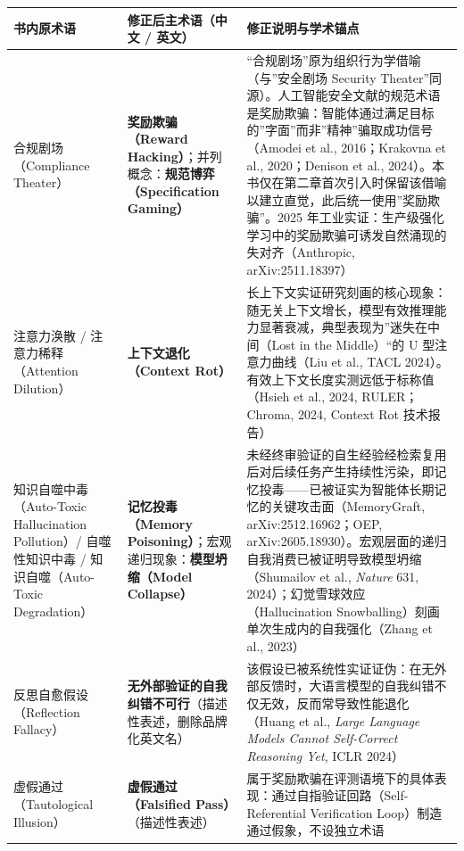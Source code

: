 {\def\LTcaptype{} %
\begin{longtable}[]{@{}
  >{\raggedright\arraybackslash}p{}
  >{\raggedright\arraybackslash}p{}
  >{\raggedright\arraybackslash}p{}@{}}
\toprule\noalign{}
\begin{minipage}[b]{\linewidth}\raggedright
书内原术语
\end{minipage} & \begin{minipage}[b]{\linewidth}\raggedright
修正后主术语（中文 / 英文）
\end{minipage} & \begin{minipage}[b]{\linewidth}\raggedright
修正说明与学术锚点
\end{minipage} \\
\midrule\noalign{}
\endhead
\bottomrule\noalign{}
\endlastfoot
合规剧场（Compliance Theater） & \textbf{奖励欺骗（Reward
Hacking）}；并列概念：\textbf{规范博弈（Specification Gaming）} &
``合规剧场''原为组织行为学借喻（与''安全剧场 Security
Theater''同源）。人工智能安全文献的规范术语是奖励欺骗：智能体通过满足目标的''字面''而非''精神''骗取成功信号（Amodei
et al., 2016；Krakovna et al., 2020；Denison et al.,
2024）。本书仅在第二章首次引入时保留该借喻以建立直觉，此后统一使用''奖励欺骗''。2025
年工业实证：生产级强化学习中的奖励欺骗可诱发自然涌现的失对齐（Anthropic,
arXiv:2511.18397） \\
注意力涣散 / 注意力稀释（Attention Dilution） &
\textbf{上下文退化（Context Rot）} &
长上下文实证研究刻画的核心现象：随无关上下文增长，模型有效推理能力显著衰减，典型表现为''迷失在中间（Lost
in the Middle）``的 U 型注意力曲线（Liu et al., TACL
2024）。有效上下文长度实测远低于标称值（Hsieh et al., 2024,
RULER；Chroma, 2024, Context Rot 技术报告） \\
知识自噬中毒（Auto-Toxic Hallucination Pollution）/ 自噬性知识中毒 /
知识自噬（Auto-Toxic Degradation） & \textbf{记忆投毒（Memory
Poisoning）}；宏观递归现象：\textbf{模型坍缩（Model Collapse）} &
未经终审验证的自生经验经检索复用后对后续任务产生持续性污染，即记忆投毒------已被证实为智能体长期记忆的关键攻击面（MemoryGraft,
arXiv:2512.16962；OEP,
arXiv:2605.18930）。宏观层面的递归自我消费已被证明导致模型坍缩（Shumailov
et al., \emph{Nature} 631, 2024）；幻觉雪球效应（Hallucination
Snowballing）刻画单次生成内的自我强化（Zhang et al., 2023） \\
反思自愈假设（Reflection Fallacy） &
\textbf{无外部验证的自我纠错不可行}（描述性表述，删除品牌化英文名） &
该假设已被系统性实证证伪：在无外部反馈时，大语言模型的自我纠错不仅无效，反而常导致性能退化（Huang
et al., \emph{Large Language Models Cannot Self-Correct Reasoning Yet},
ICLR 2024） \\
虚假通过（Tautological Illusion） & \textbf{虚假通过（Falsified
Pass）}（描述性表述） &
属于奖励欺骗在评测语境下的具体表现：通过自指验证回路（Self-Referential
Verification Loop）制造通过假象，不设独立术语 \\
\end{longtable}
}

